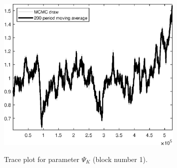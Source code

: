 \begin{figure}[H]
\centering
  \includegraphics[width=0.8\textwidth]{BRS_growth_KPR/graphs/TracePlot_Psi_K_blck_1}\\
    \caption{Trace plot for parameter ${\Psi_K}$ (block number 1).}
\end{figure}
